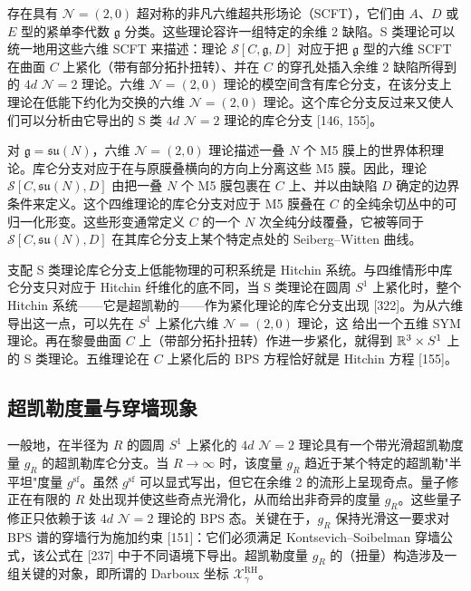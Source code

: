 存在具有 $\mathcal{N}=(2,0)$ 超对称的非凡六维超共形场论（SCFT），它们由 $A$、$D$ 或 $E$ 型的紧单李代数 $\mathfrak{g}$ 分类。这些理论容许一组特定的余维 2 缺陷。S 类理论可以统一地用这些六维 SCFT 来描述：理论 $\mathcal{S}[C,\mathfrak{g},D]$ 对应于把 $\mathfrak{g}$ 型的六维 SCFT 在曲面 $C$ 上紧化（带有部分拓扑扭转）、并在 $C$ 的穿孔处插入余维 2 缺陷所得到的 $4d$ $\mathcal{N}=2$ 理论。六维 $\mathcal{N}=(2,0)$ 理论的模空间含有库仑分支，在该分支上理论在低能下约化为交换的六维 $\mathcal{N}=(2,0)$ 理论。这个库仑分支反过来又使人们可以分析由它导出的 S 类 $4d$ $\mathcal{N}=2$ 理论的库仑分支 [146, 155]。

对 $\mathfrak{g}=\mathfrak{su}(N)$，六维 $\mathcal{N}=(2,0)$ 理论描述一叠 $N$ 个 M5 膜上的世界体积理论。库仑分支对应于在与原膜叠横向的方向上分离这些 M5 膜。因此，理论 $\mathcal{S}[C,\mathfrak{su}(N),D]$ 由把一叠 $N$ 个 M5 膜包裹在 $C$ 上、并以由缺陷 $D$ 确定的边界条件来定义。这个四维理论的库仑分支对应于 M5 膜叠在 $C$ 的全纯余切丛中的可归一化形变。这些形变通常定义 $C$ 的一个 $N$ 次全纯分歧覆叠，它被等同于 $\mathcal{S}[C,\mathfrak{su}(N),D]$ 在其库仑分支上某个特定点处的 Seiberg--Witten 曲线。

支配 S 类理论库仑分支上低能物理的可积系统是 Hitchin 系统。与四维情形中库仑分支只对应于 Hitchin 纤维化的底不同，当 S 类理论在圆周 $S^1$ 上紧化时，整个 Hitchin 系统——它是超凯勒的——作为紧化理论的库仑分支出现 [322]。为从六维导出这一点，可以先在 $S^1$ 上紧化六维 $\mathcal{N}=(2,0)$ 理论，这
给出一个五维 SYM 理论。再在黎曼曲面 $C$ 上（带部分拓扑扭转）作进一步紧化，就得到 $\mathbb{R}^3\times S^1$ 上的 S 类理论。五维理论在 $C$ 上紧化后的 BPS 方程恰好就是 Hitchin 方程 [155]。

\subsection*{超凯勒度量与穿墙现象}

一般地，在半径为 $R$ 的圆周 $S^1$ 上紧化的 $4d$ $\mathcal{N}=2$ 理论具有一个带光滑超凯勒度量 $g_R$ 的超凯勒库仑分支。当 $R\to\infty$ 时，该度量 $g_R$ 趋近于某个特定的超凯勒"半平坦"度量 $g^{\mathrm{sf}}$。虽然 $g^{\mathrm{sf}}$ 可以显式写出，但它在余维 2 的流形上呈现奇点。量子修正在有限的 $R$ 处出现并使这些奇点光滑化，从而给出非奇异的度量 $g_R$。这些量子修正只依赖于该 $4d$ $\mathcal{N}=2$ 理论的 BPS 态。关键在于，$g_R$ 保持光滑这一要求对 BPS 谱的穿墙行为施加约束 [151]：它们必须满足 Kontsevich--Soibelman 穿墙公式，该公式在 [237] 中于不同语境下导出。超凯勒度量 $g_R$ 的（扭量）构造涉及一组关键的对象，即所谓的 Darboux 坐标 $\mathcal{X}^{\mathrm{RH}}_\gamma$。

